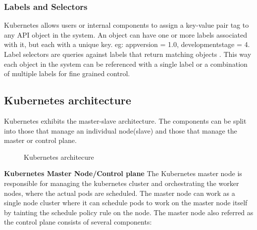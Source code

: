 \documentclass[9pt,twocolumn,twoside]{../../styles/osajnl}
\begin{document}
{\subsubsection{Labels and Selectors}
Kubernetes allows users or internal components to assign a key-value
pair tag to any API object in the system. An object can have one or
more labels associated with it, but each with a unique key. eg:
appversion = 1.0, development\textunderscore stage = 4. Label
selectors are queries against labels that return matching objects
\cite{www-kubernetes-digitalocean}. This way each object in the system
can be referenced with a single label or a combination of multiple
labels for fine grained control.

\subsection{Kubernetes architecture}
Kubernetes exhibits the master-slave architecture. The components can
be split into those that manage an individual node(slave) and those
that manage the master or control plane.

\begin{figure}[htbp]
\centering
{}
\caption{Kubernetes architecure \cite{www-kubernetes-architecture}}
\label{fig:Kubernetes Minimum Architecture}
\end{figure}

\noindent
\textbf{Kubernetes Master Node/Control plane}
\newline
The Kubernetes master node is responsible for managing the kubernetes
cluster and orchestrating the worker nodes, where the actual pods are
scheduled. The master node can work as a single node cluster where it
can schedule pods to work on the master node itself by tainting the
schedule policy rule on the node. The master node also referred as
the control plane consists of several components:

}
\end{document}
